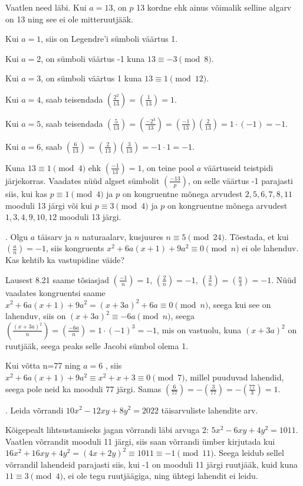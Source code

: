 \documentclass[a4paper, 10pt]{article}
\newcommand{\leg}[2]{\left(\frac{#1}{#2}\right)}
\begin{document}
Vaatlen need läbi. Kui $a=13$, on $p$ 13 kordne ehk ainus võimalik selline algarv on 13 ning see ei ole mitteruutjääk.

Kui $a=1$, siis on Legendre'i sümboli väärtus 1.

Kui $a=2$, on sümboli väärtus -1 kuna $13\equiv-3\pmod8$.

Kui $a=3$, on sümboli väärtus 1 kuna $13\equiv 1\pmod{12}$.

Kui $a=4$, saab teisendada $\leg{2^2}{13}=\leg{1}{13}=1$.

Kui $a=5$, saab teisendada $\leg{5}{13}=\leg{-2^3}{13}=\leg{-1}{13}\leg{2}{13}=1\cdot(-1)=-1$.

Kui $a=6$, saab $\leg{6}{13}=\leg{2}{13}\leg{3}{13}=-1\cdot1=-1$.

Kuna $13\equiv1\pmod4$ ehk $\leg{-1}{13}=1$, on teine pool $a$ väärtuseid teistpidi järjekorras. Vaadates nüüd algset sümbolit $\leg{-13}{p}$, on selle väärtus -1 parajasti siis, kui kas $p\equiv1\pmod4$ ja $p$ on kongruentne mõnega arvudest $2,5,6,7,8,11$ mooduli 13 järgi või kui $p\equiv3\pmod4$ ja $p$ on kongruentne mõnega arvudest $1,3,4,9,10,12$ mooduli 13 järgi.
\bigskip
\pagebreak

. Olgu $a$ täisarv ja $n$ naturaalarv, kusjuures $n\equiv 5\pmod{24}$. Tõestada, et kui $\left(\frac{a}{n} \right)=-1$, siis kongruents $x^2+6a(x+1)+9a^2\equiv 0\pmod n$ ei ole lahenduv. Kas kehtib ka vastupidine väide?

\bigskip
Lausest 8.21 saame tõsiasjad $\left(\frac{-1}{n} \right)=1$, $\left(\frac{2}{n} \right)=-1$, $\left(\frac{3}{n} \right)=\left(\frac{n}{3} \right)=-1$. Nüüd vaadates kongruentsi saame $x^2+6a(x+1)+9a^2=(x+3a)^2+6a\equiv0\pmod{n}$, seega kui see on lahenduv, siis on $(x+3a)^2\equiv-6a\pmod{n}$, seega $\left(\frac{(x+3a)^2}{n} \right)=\left(\frac{-6a}{n} \right)=1\cdot(-1)^3=-1$, mis on vastuolu, kuna $(x+3a)^2$ on ruutjääk, seega peaks selle Jacobi sümbol olema 1. 

Kui võtta n=77 ning $a=6$ , siis $x^2+6a(x+1)+9a^2\equiv x^2+x+3\equiv0\pmod{7}$, millel puuduvad lahendid, seega pole neid ka mooduli 77 järgi. Samas $\left(\frac{6}{77} \right)=-\left(\frac{3}{77} \right)=-\left(\frac{77}{3} \right)=1$.

\bigskip

. Leida võrrandi $10x^2-12xy+8y^2 = 2022$ täisarvuliste lahendite arv. 

\bigskip
Kõigepealt lihtsustamiseks jagan võrrandi läbi arvuga 2: $5x^2-6xy+4y^2 = 1011$. Vaatlen võrrandit mooduli 11 järgi, siis saan võrrandi ümber kirjutada kui \mbox{$16x^2+16xy+4y^2=(4x+2y)^2 \equiv 1011\equiv-1\pmod {11}$}. Seega leidub sellel võrrandil lahendeid parajasti siis, kui -1 on mooduli 11 järgi ruutjääk, kuid kuna $11\equiv3\pmod4$, ei ole tegu ruutjäägiga, ning ühtegi lahendit ei leidu.
\bigskip
\end{document}
